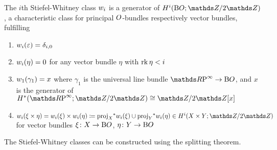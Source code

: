 \begin{Rem}
\end{Rem}

\begin{Def}
  The $i$th Stiefel-Whitney class $w_i$ is a generator of
  $H^i(\BO; \Z/2\Z)$, \idest a characteristic class for principal
  $O$-bundles respectively vector bundles, fulfilling
  \begin{enumerate}
  \item $w_i(\varepsilon)=\delta_{i,0}$
  \item $w_i(\eta) = 0$
    for any vector bundle $\eta$ with $\operatorname{rk}\eta < i$
  \item $w_1(\gamma_1) = x$
    where $\gamma_1$ is the universal line bundle $\RP\to\BO$,
    and $x$ is the generator of $H^*(\RP;\Z/2\Z)\cong\Z/2\Z[x]$
  \item $\w_i(\xi\times\eta)=\w_i(\xi)\times\w_i(\eta)
    \coloneqq \pb{\proj_X}\w_i(\xi) \cup \pb{\proj_Y}\w_i(\eta)
    \in H^i(X\times Y; \Z/2\Z)$
    for vector bundles $\xi\colon X\to\text{B$O$}$, $\eta\colon Y\to\text{B$O$}$
  \end{enumerate}
\end{Def}

\begin{Rem} %
The Stiefel-Whitney classes can be constructed using the splitting
theorem.
\end{Rem}




